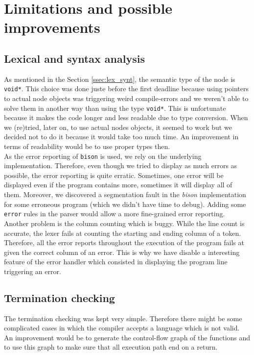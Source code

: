 \documentclass[a4paper,11pt]{article}
\begin{document}
\section{Limitations and possible improvements}
\label{sec:limit}
\subsection{Lexical and syntax analysis}
\label{ssec:flaws_syntax}
As mentioned in the Section \ref{ssec:lex_synt}, the semantic type of the node is \texttt{void*}. This choice was done juste before the first deadline because using pointers to actual node objects was triggering weird compile-errors and we weren't able to solve them in another way than using the type \texttt{void*}. This is unfortunate because it makes the code longer and less readable due to type conversion. When we (re)tried, later on, to use actual nodes objects, it seemed to work but we decided not to do it because it would take too much time. An improvement in terms of readability would be to use proper types then.
\\
As the error reporting of \texttt{bison} is used, we rely on the underlying implementation. Therefore, even though we tried to display as much errors as possible, the error reporting is quite erratic. Sometimes, one error will be displayed even if the program contains more, sometimes it will display all of them. Moreover, we discovered a segmentation fault in the \textit{bison} implementation for some erroneous program (which we didn't have time to debug). Adding some \texttt{error} rules in the parser would allow a more fine-grained error reporting. \\
Another problem is the column counting which is buggy. While the line count is accurate, the lexer fails at counting the starting and ending column of a token. Therefore, all the error reports throughout the execution of the program fails at given the correct column of an error. This is why we have disable a interesting feature of the error handler which consisted in displaying the program line triggering an error.
\subsection{Termination checking}
The termination checking was kept very simple. Therefore there might be some complicated cases in which the compiler accepts a language which is not valid. An improvement would be to generate the control-flow graph of the functions and to use this graph to  make sure that all execution path end on a return.
\end{document}
